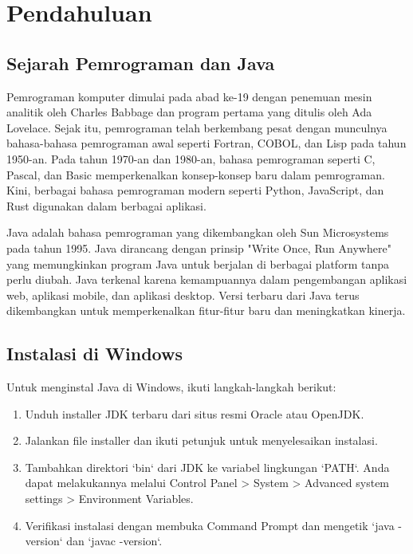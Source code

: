 
\chapter{Pendahuluan}

\section{Sejarah Pemrograman dan Java}

Pemrograman komputer dimulai pada abad ke-19 dengan penemuan mesin analitik oleh Charles Babbage dan program pertama yang ditulis oleh Ada Lovelace. Sejak itu, pemrograman telah berkembang pesat dengan munculnya bahasa-bahasa pemrograman awal seperti Fortran, COBOL, dan Lisp pada tahun 1950-an. Pada tahun 1970-an dan 1980-an, bahasa pemrograman seperti C, Pascal, dan Basic memperkenalkan konsep-konsep baru dalam pemrograman. Kini, berbagai bahasa pemrograman modern seperti Python, JavaScript, dan Rust digunakan dalam berbagai aplikasi.

Java adalah bahasa pemrograman yang dikembangkan oleh Sun Microsystems pada tahun 1995. Java dirancang dengan prinsip "Write Once, Run Anywhere" yang memungkinkan program Java untuk berjalan di berbagai platform tanpa perlu diubah. Java terkenal karena kemampuannya dalam pengembangan aplikasi web, aplikasi mobile, dan aplikasi desktop. Versi terbaru dari Java terus dikembangkan untuk memperkenalkan fitur-fitur baru dan meningkatkan kinerja.

\section{Instalasi di Windows}

Untuk menginstal Java di Windows, ikuti langkah-langkah berikut:

\begin{enumerate}
\item Unduh installer JDK terbaru dari situs resmi Oracle atau OpenJDK.
\item Jalankan file installer dan ikuti petunjuk untuk menyelesaikan instalasi.
\item Tambahkan direktori `bin` dari JDK ke variabel lingkungan `PATH`. Anda dapat melakukannya melalui Control Panel > System > Advanced system settings > Environment Variables.
\item Verifikasi instalasi dengan membuka Command Prompt dan mengetik `java -version` dan `javac -version`.
\end{enumerate}

